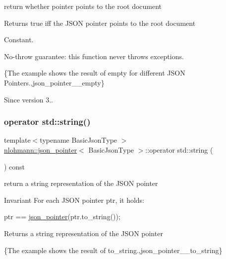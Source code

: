 return whether pointer points to the root document 

\begin{DoxyReturn}{Returns}
true iff the J\+S\+ON pointer points to the root document
\end{DoxyReturn}
Constant.

No-\/throw guarantee\+: this function never throws exceptions.

\{The example shows the result of {\ttfamily empty} for different J\+S\+ON Pointers.,json\+\_\+pointer\+\_\+\+\_\+empty\}

\begin{DoxySince}{Since}
version 3.. 
\end{DoxySince}
\mbox{\label{classnlohmann_1_1json__pointer_ae9015c658f99cf3d48a8563accc79988}} 
\subsubsection{\texorpdfstring{operator std\+::string()}{operator std::string()}}
{\footnotesize\ttfamily template$<$typename Basic\+Json\+Type $>$ \\
\mbox{\hyperlink{classnlohmann_1_1json__pointer}{nlohmann\+::json\+\_\+pointer}}$<$ Basic\+Json\+Type $>$\+::operator std\+::string (\begin{DoxyParamCaption}{ }\end{DoxyParamCaption}) const\hspace{0.3cm}{\ttfamily [inline]}}



return a string representation of the J\+S\+ON pointer 

\begin{DoxyInvariant}{Invariant}
For each J\+S\+ON pointer {\ttfamily ptr}, it holds\+: 
\begin{DoxyCode}
ptr == \mbox{\hyperlink{classnlohmann_1_1json__pointer_a7f32d7c62841f0c4a6784cf741a6e4f8}{json\_pointer}}(ptr.to\_string());
\end{DoxyCode}

\end{DoxyInvariant}
\begin{DoxyReturn}{Returns}
a string representation of the J\+S\+ON pointer
\end{DoxyReturn}
\{The example shows the result of {\ttfamily to\+\_\+string}.,json\+\_\+pointer\+\_\+\+\_\+to\+\_\+string\}

